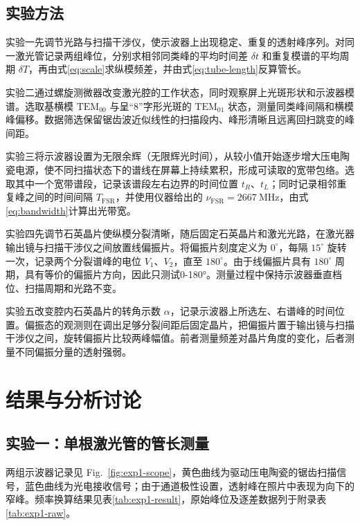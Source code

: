 \documentclass[UTF8,a4paper,10pt]{ctexart}
\begin{document}
\subsection{实验方法}

实验一先调节光路与扫描干涉仪，使示波器上出现稳定、重复的透射峰序列。对同一激光管记录两组峰位，分别求相邻同类峰的平均时间差 $\delta t$ 和重复模谱的平均周期 $\delta T$，再由式\eqref{eq:scale}求纵模频差，并由式\eqref{eq:tube-length}反算管长。

实验二通过螺旋测微器改变激光腔的工作状态，同时观察屏上光斑形状和示波器模谱。选取基横模 $\mathrm{TEM}_{00}$ 与呈“8”字形光斑的 $\mathrm{TEM}_{01}$ 状态，测量同类峰间隔和横模峰偏移。数据筛选保留锯齿波近似线性的扫描段内、峰形清晰且远离回扫跳变的峰间距。

实验三将示波器设置为无限余辉（无限辉光时间），从较小值开始逐步增大压电陶瓷电源，使不同扫描状态下的谱线在屏幕上持续累积，形成可读取的宽带包络。选取其中一个宽带谱段，记录该谱段左右边界的时间位置 $t_R$、$t_L$；同时记录相邻重复峰之间的时间间隔 $T_{\mathrm{FSR}}$，并使用仪器给出的 $\nu_{\mathrm{FSR}}=\SI{2667}{\mega\hertz}$，由式\eqref{eq:bandwidth}计算出光带宽。

实验四先调节石英晶片使纵模分裂清晰，随后固定石英晶片和激光光路，在激光器输出镜与扫描干涉仪之间放置线偏振片。将偏振片刻度定义为 $0^\circ$，每隔 $15^\circ$ 旋转一次，记录两个分裂谱峰的电位 $V_1$、$V_2$，直至 $180^\circ$。由于线偏振片具有 $180^\circ$ 周期，具有等价的偏振片方向，因此只测试0-180°。测量过程中保持示波器垂直档位、扫描周期和光路不变。

实验五改变腔内石英晶片的转角示数 $\alpha$，记录示波器上所选左、右谱峰的时间位置。偏振态的观测则在调出足够分裂间距后固定晶片，把偏振片置于输出镜与扫描干涉仪之间，旋转偏振片比较两峰幅值。前者测量频差对晶片角度的变化，后者测量不同偏振分量的透射强弱。

\section{结果与分析讨论}

\subsection{实验一：单根激光管的管长测量}

两组示波器记录见 Fig.~\ref{fig:exp1-scope}，黄色曲线为驱动压电陶瓷的锯齿扫描信号，蓝色曲线为光电接收信号；由于通道极性设置，透射峰在照片中表现为向下的窄峰。频率换算结果见表\ref{tab:exp1-result}，原始峰位及逐差数据列于附录表\ref{tab:exp1-raw}。
\end{document}
